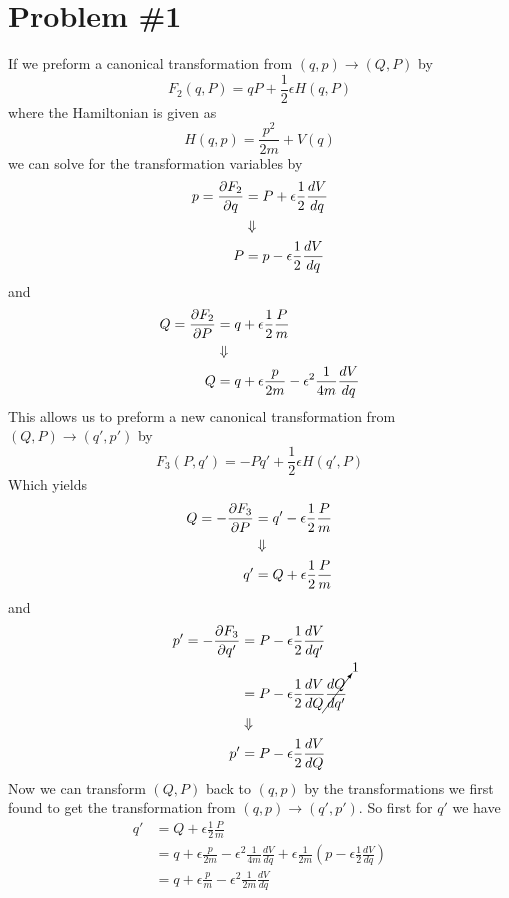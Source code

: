 \documentclass[11pt]{article}
\numberwithin{equation}{section}
\begin{document}


\section{Problem \#1}
If we preform a canonical transformation from $(q,p)\rightarrow(Q,P)$ by
$$F_2(q,P) = qP + \frac{1}{2}\epsilon H(q,P)$$
where the Hamiltonian is given as
$$H(q,p) = \frac{p^2}{2m}+V(q)$$
we can solve for the transformation variables by
\begin{align*}
p = \frac{\partial{F_2}}{\partial{q}} &= P + \epsilon\frac{1}{2}\frac{dV}{dq}\\
&\Downarrow\\
P &= p - \epsilon\frac{1}{2}\frac{dV}{dq}
\end{align*}
and
\begin{align*}
Q = \frac{\partial{F_2}}{\partial{P}} &= q + \epsilon\frac{1}{2}\frac{P}{m}\\
&\Downarrow\\
Q &= q + \epsilon\frac{p}{2m} - \epsilon^2\frac{1}{4m}\frac{dV}{dq}
\end{align*}
This allows us to preform a new canonical transformation from $(Q,P)\rightarrow(q',p')$ by
$$F_3(P,q') = -Pq' + \frac{1}{2}\epsilon H(q',P)$$
Which yields
\begin{align*}
Q = -\frac{\partial{F_3}}{\partial{P}} &= q' - \epsilon\frac{1}{2}\frac{P}{m}\\
&\Downarrow\\
q' &= Q + \epsilon\frac{1}{2}\frac{P}{m}
\end{align*}
and
\begin{align*}
p' = -\frac{\partial{F_3}}{\partial{q'}} &= P - \epsilon\frac{1}{2}\frac{dV}{dq'}\\
&= P - \epsilon\frac{1}{2}\frac{dV}{dQ}\cancelto{1}{\frac{dQ}{dq'}}\\
&\Downarrow\\
p' &= P - \epsilon\frac{1}{2}\frac{dV}{dQ}
\end{align*}
Now we can transform $(Q,P)$ back to $(q,p)$ by the transformations we first found to get the
transformation from $(q,p)\rightarrow(q',p')$. So first for $q'$ we have
\begin{align*}
q' &= Q + \epsilon\frac{1}{2}\frac{P}{m}\\
&= q + \epsilon\frac{p}{2m} - \epsilon^2\frac{1}{4m}\frac{dV}{dq} + \epsilon\frac{1}{2m}\left( p - \epsilon\frac{1}{2}\frac{dV}{dq}\right)\\
&= q + \epsilon\frac{p}{m} - \epsilon^2\frac{1}{2m}\frac{dV}{dq} 
\end{align*}
\end{document}
